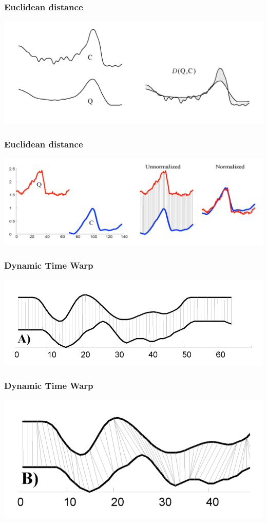 \documentclass{beamer}
\begin{document}
\begin{frame}
	\frametitle{Euclidean distance}
	\includegraphics[scale=0.25]{../img/euclidean.png}
\end{frame} 

\begin{frame}
	\frametitle{Euclidean distance}
	\includegraphics[scale=0.19]{../img/normalization.png}
\end{frame} 

\begin{frame}
	\frametitle{Dynamic Time Warp}
	\includegraphics[scale=0.25]{../img/DTW.png}
\end{frame} 

\begin{frame}
	\frametitle{Dynamic Time Warp}
	\includegraphics[scale=0.30]{../img/DTW2.png}
\end{frame} 
\end{document}
